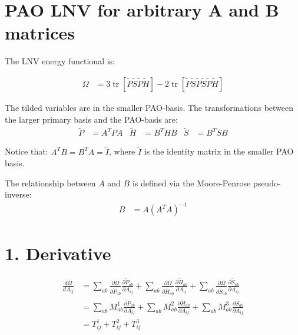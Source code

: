 \documentclass{article}
\newcommand{\tr}{\operatorname{tr}}
\begin{document}
\section*{PAO LNV for arbitrary A and B matrices}

The LNV energy functional is:

\begin{align*}
    \Omega & = 3\tr[\tilde P \tilde S \tilde P \tilde H ] - 2\tr[\tilde P \tilde S \tilde P \tilde S \tilde P \tilde H]
\end{align*}

The tilded variables are in the smaller PAO-basis. The transformations between the larger primary basis and the PAO-basis are:
\begin{align*}
    \tilde P &= A^T  P A &
    \tilde H &= B^T  H B &
    \tilde S &= B^T  S B
\end{align*}

Notice that: $ A^T B = B^T A = \tilde I $, where $\tilde I$ is the identity matrix in the smaller PAO basis.

The relationship between $A$ and $B$ is defined via the Moore-Penrose pseudo-inverse:
\begin{align*}
    B & = A (A^T A) ^{-1}
\end{align*}



\newpage
\section*{1. Derivative}

\begin{align*}
    \frac{d \Omega}{d A_{ij}}
 &= \sum_{ab} \frac{\partial \Omega}{\partial \tilde P_{ab}}  \frac{\partial \tilde P_{ab}}{\partial A_{ij}}
  + \sum_{ab} \frac{\partial \Omega}{\partial \tilde H_{ab}}  \frac{\partial \tilde H_{ab}}{\partial A_{ij}}
  + \sum_{ab} \frac{\partial \Omega}{\partial \tilde S_{ab}}  \frac{\partial \tilde S_{ab}}{\partial A_{ij}}\\
 &= \sum_{ab} M^1_{ab} \frac{\partial \tilde P_{ab}}{\partial A_{ij}}
  + \sum_{ab} M^2_{ab} \frac{\partial \tilde H_{ab}}{\partial A_{ij}}
  + \sum_{ab} M^3_{ab} \frac{\partial \tilde S_{ab}}{\partial A_{ij}}\\
 &= T^1_{ij} + T^2_{ij} + T^3_{ij}
\end{align*}
\end{document}
